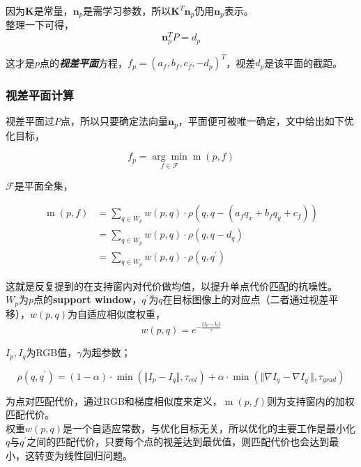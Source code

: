 因为$\mathbf{K}$是常量，$\mathbf{n}_p$是需学习参数，所以$\mathbf{K}^T \mathbf{n}_p$仍用$\mathbf{n}_p$表示。\\

整理一下可得，
$$
	\mathbf{n}_p^T P =d_p
$$

这才是$p$点的\textbf{\textit{视差平面}}方程，$f_p = (a_f,b_f,c_f,-d_p)^T$，视差$d_p$是该平面的截距。

\subsubsection*{视差平面计算}

视差平面过$P$点，所以只要确定法向量$\mathbf{n}_p$，平面便可被唯一确定，文中给出如下优化目标，

\begin{equation}
	f_p = \underset{f\in \mathcal{F}}{\arg\min} \mathop{m}(p,f)\label{disparity_eq_opt}
\end{equation}

$\mathcal{F}$是平面全集，

\begin{align*}
	\mathop{m}(p,f) &= \sum_{q\in W_p} w(p,q)\cdot \rho\left(q,q-(a_{f}q_x + b_fq_y +c_f)\right) \\
	&= \sum_{q\in W_p} w(p,q)\cdot \rho\left(q,q-d_q\right)\\
	&= \sum_{q\in W_p} w(p,q)\cdot \rho\left(q,q^\prime\right)
\end{align*}

这就是反复提到的在支持窗内对代价做均值，以提升单点代价匹配的抗噪性。\\

$W_p$为$p$点的\textbf{support window}，$q^\prime$为$q$在目标图像上的对应点（二者通过视差平移），$w(p,q)$为自适应相似度权重，
$$
	w(p,q) = e^{-\frac{\Vert I_p - I_q\Vert}{\gamma}}
$$

$I_p,I_q$为RGB值，$\gamma$为超参数；

$$
	\rho(q,q^\prime) = (1-\alpha)\cdot \min\left(\Vert I_p - I_q\Vert, \tau_{col}\right) + \alpha\cdot\min\left(\Vert\nabla I_q - \nabla I_{q^\prime} \Vert, \tau_{grad}\right)
$$

为点对匹配代价，通过RGB和梯度相似度来定义，$\mathop{m}(p,f)$则为支持窗内的加权匹配代价。\\

权重$w(p,q)$是一个自适应常数，与优化目标无关，所以优化的主要工作是最小化$q$与$q^\prime$之间的匹配代价，只要每个点的视差达到最优值，则匹配代价也会达到最小，这转变为线性回归问题。\\

